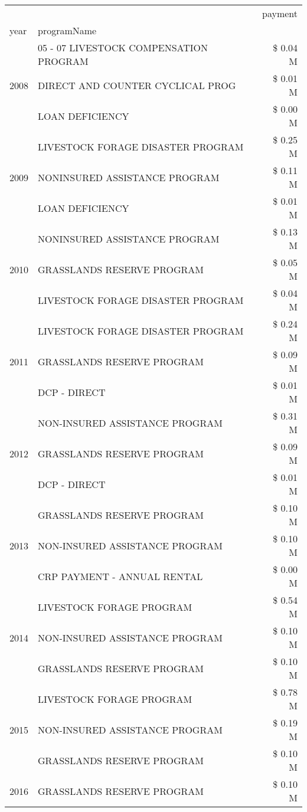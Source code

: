 \begin{tabular}{llr}
\toprule
 &  & payment \\
year & programName &  \\
\midrule
\multirow[t]{3}{*}{2008} & 05 - 07 LIVESTOCK COMPENSATION PROGRAM & \$ 0.04 M \\
 & DIRECT AND COUNTER CYCLICAL PROG & \$ 0.01 M \\
 & LOAN DEFICIENCY & \$ 0.00 M \\
\cline{1-3}
\multirow[t]{3}{*}{2009} & LIVESTOCK FORAGE DISASTER  PROGRAM & \$ 0.25 M \\
 & NONINSURED ASSISTANCE PROGRAM & \$ 0.11 M \\
 & LOAN DEFICIENCY & \$ 0.01 M \\
\cline{1-3}
\multirow[t]{3}{*}{2010} & NONINSURED ASSISTANCE PROGRAM & \$ 0.13 M \\
 & GRASSLANDS RESERVE PROGRAM & \$ 0.05 M \\
 & LIVESTOCK FORAGE DISASTER  PROGRAM & \$ 0.04 M \\
\cline{1-3}
\multirow[t]{3}{*}{2011} & LIVESTOCK FORAGE DISASTER PROGRAM & \$ 0.24 M \\
 & GRASSLANDS RESERVE PROGRAM & \$ 0.09 M \\
 & DCP - DIRECT & \$ 0.01 M \\
\cline{1-3}
\multirow[t]{3}{*}{2012} & NON-INSURED ASSISTANCE PROGRAM & \$ 0.31 M \\
 & GRASSLANDS RESERVE PROGRAM & \$ 0.09 M \\
 & DCP - DIRECT & \$ 0.01 M \\
\cline{1-3}
\multirow[t]{3}{*}{2013} & GRASSLANDS RESERVE PROGRAM & \$ 0.10 M \\
 & NON-INSURED ASSISTANCE PROGRAM & \$ 0.10 M \\
 & CRP PAYMENT - ANNUAL RENTAL & \$ 0.00 M \\
\cline{1-3}
\multirow[t]{3}{*}{2014} & LIVESTOCK FORAGE PROGRAM & \$ 0.54 M \\
 & NON-INSURED ASSISTANCE PROGRAM & \$ 0.10 M \\
 & GRASSLANDS RESERVE PROGRAM & \$ 0.10 M \\
\cline{1-3}
\multirow[t]{3}{*}{2015} & LIVESTOCK FORAGE PROGRAM & \$ 0.78 M \\
 & NON-INSURED ASSISTANCE PROGRAM & \$ 0.19 M \\
 & GRASSLANDS RESERVE PROGRAM & \$ 0.10 M \\
\cline{1-3}
\multirow[t]{3}{*}{2016} & GRASSLANDS RESERVE PROGRAM & \$ 0.10 M \\

\end{tabular}
